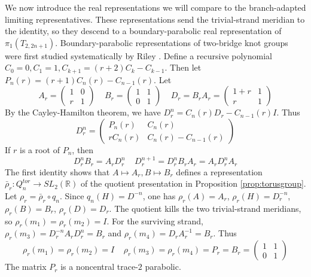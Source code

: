 \documentclass{article}
\theoremstyle{plain}
\theoremstyle{definition}
\theoremstyle{plain}
\theoremstyle{plain}
\theoremstyle{plain}
\theoremstyle{remark}
\theoremstyle{remark}
\theoremstyle{plain}
\theoremstyle{plain}
\theoremstyle{plain}
\theoremstyle{plain}
\begin{document}
\medskip

We now introduce the real representations we will compare to the branch-adapted limiting representatives. These representations send the trivial-strand meridian to the identity, so they descend to a boundary-parabolic real representation of $\pi_1(T_{2,2n+1})$. Boundary-parabolic representations of two-bridge knot groups were first studied systematically by Riley \cite{riley}. Define a recursive polynomial $C_0 = 0, C_1 = 1, C_{k+1} = (r+2)C_k-C_{k-1}$. Then let $P_n(r) = (r+1)C_n(r) - C_{n-1}(r)$. Let
\begin{equation*}
	A_r = \begin{pmatrix}1 & 0 \\ r & 1\end{pmatrix} \ \ \ \ \ B_r = \begin{pmatrix}1 & 1 \\ 0 & 1\end{pmatrix} \ \ \ \ \ D_r = B_rA_r = \begin{pmatrix}1 + r & 1 \\ r & 1\end{pmatrix}
\end{equation*}
By the Cayley-Hamilton theorem, we have $D_r^n = C_n(r)D_r - C_{n-1}(r)I$. Thus
\begin{equation*}
	D_r^n = \begin{pmatrix}P_n(r)&C_n(r) \\ rC_n(r) & C_n(r) - C_{n-1}(r)\end{pmatrix}
\end{equation*}
If $r$ is a root of $P_n$, then
\begin{equation}\label{eq:rootidentity}
	D_r^nB_r = A_rD_r^n \ \ \ \ \ D_r^{n+1} = D_r^nB_rA_r = A_rD_r^nA_r
\end{equation}
The first identity shows that $A \mapsto A_r, B \mapsto B_r$ defines a representation $\bar\rho_r: Q_n^{tor} \to SL_2(\mathbb R)$ of the quotient presentation in Proposition \ref{prop:torusgroup}. Let $\rho_r = \bar\rho_r \circ q_n$. Since $q_n(H) = D^{-n}$, one has $\rho_r(A) = A_r$, $\rho_r(H) = D_r^{-n}$, $\rho_r(B) = B_r$, $\rho_r(D) = D_r$. The quotient kills the two trivial-strand meridians, so $\rho_r(m_1) = \rho_r(m_2) = I$. For the surviving strand, $\rho_r(m_3) = D_r^{-n}A_rD_r^n=B_r$ and $\rho_r(m_4) = D_rA_r^{-1}=B_r$. Thus
\begin{equation}\label{eq:torus-meridian-images}
	\rho_r(m_1) = \rho_r(m_2) = I \ \ \ \ \ \rho_r(m_3) = \rho_r(m_4) = P_r = B_r = \begin{pmatrix}1 & 1 \\ 0 & 1\end{pmatrix}
\end{equation}
The matrix $P_r$ is a noncentral trace-$2$ parabolic.
\end{document}

